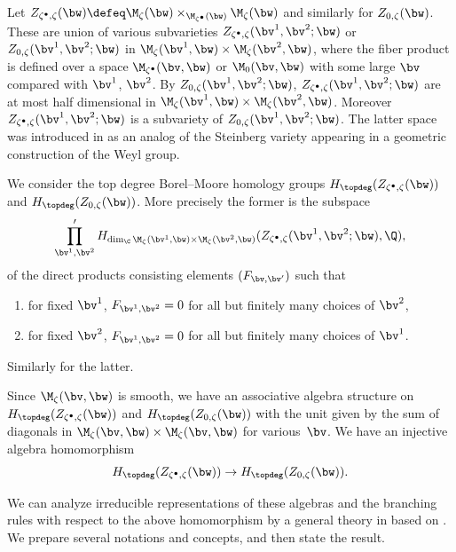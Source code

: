 Let
\(
  Z_{\zeta^\bullet,\zeta}(\bw) \defeq
  \M_{\zeta}(\bw)\times_{\M_{\zeta^\bullet}(\bw)} \M_\zeta(\bw)
\)
and similarly for $Z_{0,\zeta}(\bw)$. These are union of various
subvarieties $Z_{\zeta^\bullet,\zeta}(\bv^1,\bv^2;\bw)$
or $Z_{0,\zeta}(\bv^1,\bv^2;\bw)$
in $\M_\zeta(\bv^1,\bw)\times\M_\zeta(\bv^2,\bw)$, where the f\/iber
product is def\/ined over a space $\M_{\zeta^\bullet}(\bv,\bw)$
or $\M_0(\bv,\bw)$ with some large $\bv$ compared with $\bv^1$, $\bv^2$.
%
By  $Z_{0,\zeta}(\bv^1,\bv^2;\bw)$,
$Z_{\zeta^\bullet,\zeta}(\bv^1,\bv^2;\bw)$ are at most
half dimensional in $\M_\zeta(\bv^1,\bw)\times\M_\zeta(\bv^2,\bw)$.
%
Moreover $Z_{\zeta^\bullet,\zeta}(\bv^1,\bv^2;\bw)$ is a subvariety of
$Z_{0,\zeta}(\bv^1,\bv^2;\bw)$.
%
The latter space was introduced in \cite{Na-alg} as an analog of the
Steinberg variety appearing in a geometric construction of the Weyl group.

We consider the top degree Borel--Moore homology groups
$H_\topdeg(Z_{\zeta^\bullet,\zeta}(\bw))$ and
$H_\topdeg(Z_{0,\zeta}(\bw))$. More precisely the former is the subspace
\[
\prod_{\bv^1,\bv^2}' H_{\dim_\C \M_\zeta(\bv^1,\bw)\times\M_\zeta(\bv^2,\bw)}
(Z_{\zeta^\bullet,\zeta}(\bv^1,\bv^2;\bw),\Q),
\]
of the direct products consisting elements $(F_{\bv,\bv'})$ such
that{\samepage
\begin{enumerate}\itemsep=0pt
\item[1)] for f\/ixed $\bv^1$, $F_{\bv^1,\bv^2} = 0$ for all but f\/initely
many choices of $\bv^2$,
\item[2)] for f\/ixed $\bv^2$, $F_{\bv^1,\bv^2} = 0$  for all but f\/initely
many choices of $\bv^1$.
\end{enumerate}
Similarly for the latter.}

Since $\M_\zeta(\bv,\bw)$ is smooth, we have an associative algebra
structure on $H_\topdeg(Z_{\zeta^\bullet,\zeta}(\bw))$ and
$H_\topdeg(Z_{0,\zeta}(\bw))$ with the unit given by the sum of
diagonals in $\M_\zeta(\bv,\bw)\times\M_\zeta(\bv,\bw)$ for va\-rious~$\bv$.
%
We have an injective algebra homomorphism
\begin{equation}\label{eq:subalg}
    H_\topdeg(Z_{\zeta^\bullet,\zeta}(\bw)) \to
    H_\topdeg(Z_{0,\zeta}(\bw)).
\end{equation}

We can analyze irreducible representations of these algebras and the
branching rules with respect to the above homomorphism by a general
theory in \cite{CG} based on \cite{BM}. We prepare several notations
and concepts, and then state the result.

